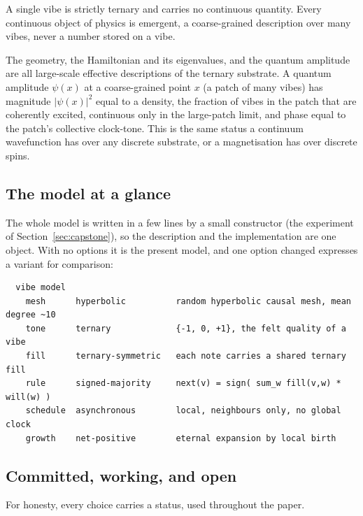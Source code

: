 A single vibe is strictly ternary and carries no continuous quantity. Every continuous
object of physics is emergent, a coarse-grained description over many vibes, never a
number stored on a vibe.

\begin{principle}
The geometry, the Hamiltonian and its eigenvalues, and the quantum amplitude are all
large-scale effective descriptions of the ternary substrate. A quantum amplitude
$\psi(x)$ at a coarse-grained point $x$ (a patch of many vibes) has magnitude
$|\psi(x)|^2$ equal to a density, the fraction of vibes in the patch that are
coherently excited, continuous only in the large-patch limit, and phase equal to the
patch's collective clock-tone. This is the same status a continuum wavefunction has
over any discrete substrate, or a magnetisation has over discrete spins.
\end{principle}

\subsection{The model at a glance}

The whole model is written in a few lines by a small constructor (the experiment of
Section~\ref{sec:capstone}), so the description and the implementation are one object.
With no options it is the present model, and one option changed expresses a variant
for comparison:

\begin{verbatim}
  vibe model
    mesh      hyperbolic          random hyperbolic causal mesh, mean degree ~10
    tone      ternary             {-1, 0, +1}, the felt quality of a vibe
    fill      ternary-symmetric   each note carries a shared ternary fill
    rule      signed-majority     next(v) = sign( sum_w fill(v,w) * will(w) )
    schedule  asynchronous        local, neighbours only, no global clock
    growth    net-positive        eternal expansion by local birth
\end{verbatim}

\subsection{Committed, working, and open}

For honesty, every choice carries a status, used throughout the paper.

